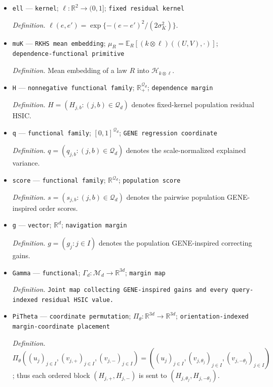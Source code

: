 \documentclass{article}
\begin{document}
\begin{itemize}
  \item \texttt{ell} --- \texttt{kernel}; \(\ell:\mathbb R^2\to(0,1]\); \texttt{fixed residual kernel}
  \par\smallskip\noindent\emph{Definition.} \(\ell(e,e')=\exp\{-(e-e')^2/(2\sigma_K^2)\}\).
  \item \texttt{muK} --- \texttt{RKHS mean embedding}; \(\mu_R=\mathbb E_R[(k\otimes\ell)((U,V),\cdot)]\); \texttt{dependence-\allowbreak{}functional primitive}
  \par\smallskip\noindent\emph{Definition.} Mean embedding of a law \(R\) into \(\mathcal H_{k\otimes\ell}\).
  \item \texttt{H} --- \texttt{nonnegative functional family}; \(\mathbb R_+^{\mathcal Q_d}\); \texttt{dependence margin}
  \par\smallskip\noindent\emph{Definition.} \(H=(H_{j,b}:(j,b)\in\mathcal Q_d)\) denotes fixed-kernel population residual HSIC.
  \item \texttt{q} --- \texttt{functional family}; \([0,1]^{\mathcal Q_d}\); \texttt{GENE regression coordinate}
  \par\smallskip\noindent\emph{Definition.} \(q=(q_{j,b}:(j,b)\in\mathcal Q_d)\) denotes the scale-normalized explained variance.
  \item \texttt{score} --- \texttt{functional family}; \(\mathbb R^{\mathcal Q_d}\); \texttt{population score}
  \par\smallskip\noindent\emph{Definition.} \(s=(s_{j,b}:(j,b)\in\mathcal Q_d)\) denotes the pairwise population GENE-inspired order scores.
  \item \texttt{g} --- \texttt{vector}; \(\mathbb R^d\); \texttt{navigation margin}
  \par\smallskip\noindent\emph{Definition.} \(g=(g_j:j\in I)\) denotes the population GENE-inspired correcting gains.
  \item \texttt{Gamma} --- \texttt{functional}; \(\Gamma_d:\mathcal M_d\to\mathbb R^{3d}\); \texttt{margin map}
  \par\smallskip\noindent\emph{Definition.} \texttt{Joint map collecting GENE-\allowbreak{}inspired gains and every query-\allowbreak{}indexed residual HSIC value.}
  \item \texttt{PiTheta} --- \texttt{coordinate permutation}; \(\Pi_\theta:\mathbb R^{3d}\to\mathbb R^{3d}\); \texttt{orientation-\allowbreak{}indexed margin-\allowbreak{}coordinate placement}
  \par\smallskip\noindent\emph{Definition.} \(\Pi_\theta((u_j)_{j\in I},(v_{j,+})_{j\in I},(v_{j,-})_{j\in I})=((u_j)_{j\in I},(v_{j,\theta_j})_{j\in I},(v_{j,-\theta_j})_{j\in I})\); thus each ordered block \((H_{j,+},H_{j,-})\) is sent to \((H_{j,\theta_j},H_{j,-\theta_j})\).

\end{itemize}
\end{document}
